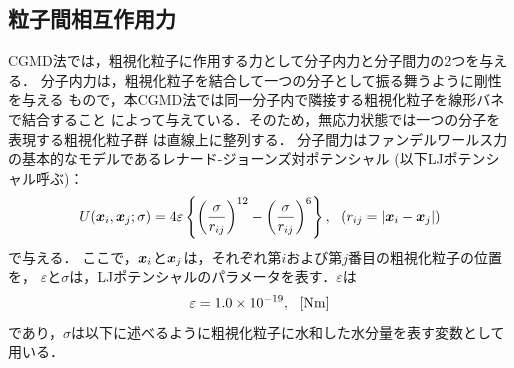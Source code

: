 \subsection{粒子間相互作用力}
CGMD法では，粗視化粒子に作用する力として分子内力と分子間力の2つを与える．
分子内力は，粗視化粒子を結合して一つの分子として振る舞うように剛性を与える
もので，本CGMD法では同一分子内で隣接する粗視化粒子を線形バネで結合すること
によって与えている．そのため，無応力状態では一つの分子を表現する粗視化粒子群
は直線上に整列する．
分子間力はファンデルワールス力の基本的なモデルであるレナード-ジョーンズ対ポテンシャル
(以下LJポテンシャル呼ぶ)：
\begin{equation}
	U(\mbox{\boldmath $x$}_i,\mbox{\boldmath $x$}_j; \sigma) 
	= 4 \varepsilon 
	\left\{ 
	\left(\frac{\sigma}{r_{ij}}\right)^{12}
	-
	\left(\frac{\sigma}{r_{ij}}\right)^6
	\right\}, \ \ \left( r_{ij}=\left| \mbox{\boldmath $x$}_i-\mbox{\boldmath $x$}_j\right| \right)
	\label{eqn:LJ}
\end{equation}
で与える．
ここで，$\mbox{\boldmath $x$}_i$と$\mbox{\boldmath $x$}_j$は，それぞれ第$i$および第$j$番目の粗視化粒子の位置を，
$\varepsilon$と$\sigma$は，LJポテンシャルのパラメータを表す．$\varepsilon$は
\begin{equation}
	\varepsilon=1.0\times 10^{-19}, \ \ [{\rm Nm}]
	\label{eqn:eps_of_LJ}
\end{equation}
であり，$\sigma$は以下に述べるように粗視化粒子に水和した水分量を表す変数として用いる．

